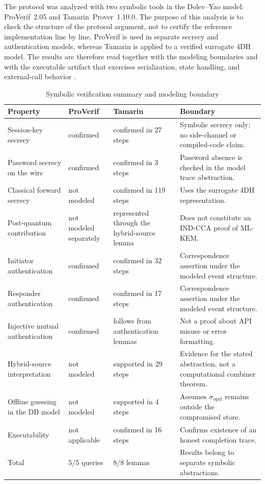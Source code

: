 \documentclass[preprint,12pt]{elsarticle}
\newcommand{\sigoprf}{\sigma_{\mathrm{oprf}}}
\theoremstyle{remark}
\begin{document}
The protocol was analyzed with two symbolic tools in the Dolev--Yao
model: ProVerif~2.05 and Tamarin~Prover~1.10.0. The purpose of this
analysis is to check the structure of the protocol argument, not to
certify the reference implementation line by line. ProVerif is used in
separate secrecy and authentication models, whereas Tamarin is applied
to a verified surrogate 4DH model. The results are therefore read
together with the modeling boundaries and with the executable artifact
that exercises serialization, state handling, and external-call behavior
\cite{cremers2012,basin2018}.

\begin{table}[htbp]
\caption{Symbolic verification summary and modeling boundary}
\label{tab:verification-summary}
\centering\scriptsize
\begin{tabularx}{\textwidth}{@{}L{3.4cm}L{2.4cm}L{3.3cm}X@{}}
\toprule
Property & ProVerif & Tamarin & Boundary \\
\midrule
Session-key secrecy & confirmed & confirmed in 27 steps & Symbolic secrecy only; no side-channel or compiled-code claim. \\
Password secrecy on the wire & confirmed & confirmed in 3 steps & Password absence is checked in the model trace abstraction. \\
Classical forward secrecy & not modeled & confirmed in 119 steps & Uses the surrogate 4DH representation. \\
Post-quantum contribution & not modeled separately & represented through the hybrid-source lemma & Does not constitute an IND-CCA proof of ML-KEM. \\
Initiator authentication & confirmed & confirmed in 32 steps & Correspondence assertion under the modeled event structure. \\
Responder authentication & confirmed & confirmed in 17 steps & Correspondence assertion under the modeled event structure. \\
Injective mutual authentication & confirmed & follows from authentication lemmas & Not a proof about API misuse or error formatting. \\
Hybrid-source interpretation & not modeled & supported in 29 steps & Evidence for the stated abstraction, not a computational combiner theorem. \\
Offline guessing in the DB model & not modeled & supported in 4 steps & Assumes $\sigoprf$ remains outside the compromised store. \\
Executability & not applicable & confirmed in 16 steps & Confirms existence of an honest completion trace. \\
\midrule
Total & 5/5 queries & 8/8 lemmas & Results belong to separate symbolic abstractions. \\
\bottomrule
\end{tabularx}
\end{table}
\end{document}
